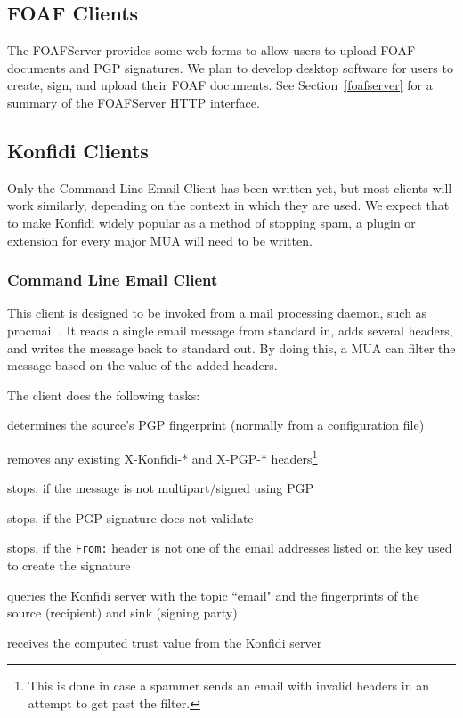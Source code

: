 \documentclass[letterpaper]{www2006-submission}
\newenvironment{enumerate_tight}{
\begin{enumerate}
  \setlength{\itemsep}{1pt}
  \setlength{\parskip}{0pt}
  \setlength{\parsep}{0pt}}{\end{enumerate}
}
\begin{document}
\subsection{FOAF Clients}
The FOAFServer provides some web forms to allow users to upload FOAF documents and PGP signatures.  We plan to develop desktop software for users to create, sign, and upload their FOAF documents.  See Section~\ref{foafserver} for a summary of the FOAFServer HTTP interface.

\subsection{Konfidi Clients}
Only the Command Line Email Client has been written yet, but most clients will work similarly, depending on the context in which they are used.  We expect that to make Konfidi widely popular as a method of stopping spam, a plugin or extension for every major MUA will need to be written.

\subsubsection{Command Line Email Client}
This client is designed to be invoked from a mail processing daemon, such as procmail \citep{procmail}.  It reads a single email message from standard in, adds several headers, and writes the message back to standard out.  By doing this, a MUA can filter the message based on the value of the added headers.

The client does the following tasks:
\begin{enumerate_tight}
\item determines the source's PGP fingerprint (normally from a configuration file)
\item  removes any existing X-Konfidi-* and X-PGP-* headers\footnote{This is done in case a spammer sends an email with invalid headers in an attempt to get past the filter.}
\item  stops, if the message is not multipart/signed using PGP
\item  stops, if the PGP signature does not validate
\item  stops, if the \texttt{From:} header is not one of the email addresses listed on the key used to create the signature
\item  queries the Konfidi server with the topic ``email" and the fingerprints of the source (recipient) and sink (signing party)
\item  receives the computed trust value from the Konfidi server
\end{enumerate_tight}
\end{document}
